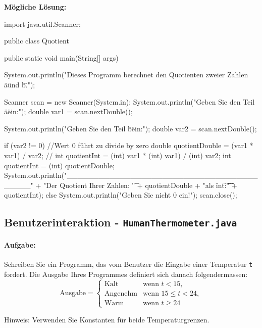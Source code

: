 \documentclass[a4paper,10pt, dvipsnames]{report}
\begin{document}
\textbf{Mögliche Lösung:}

\begin{javacodebox}
import java.util.Scanner;

public class Quotient {
    public static void main(String[] args) {

        System.out.println("Dieses Programm berechnet den Quotienten
                            zweier Zahlen \"a\" und \"b\".");
        
        Scanner scan = new Scanner(System.in);
        System.out.println("Geben Sie den Teil \"a\" ein:");
        double var1 = scan.nextDouble();
        
        System.out.println("Geben Sie den Teil \"b\" ein:");
        double var2 = scan.nextDouble();
        
        if (var2 != 0) { //Wert 0 führt zu divide by zero
            double quotientDouble = (var1 * var1) / var2;
            // int quotientInt = (int) var1 * (int) var1) / (int) var2;
            int quotientInt = (int) quotientDouble;
            System.out.println("_________________________________________\n" + 
                "Der Quotient Ihrer Zahlen: \t" + quotientDouble + 
                "\nUnd als \"int\":\t \t \t" + quotientInt);
        } else { 
            System.out.println("Geben Sie nicht 0 ein!");
        }
        scan.close();
    }
}
\end{javacodebox}

\subsection{Benutzerinteraktion - \texttt{HumanThermometer.java}}

\paragraph{Aufgabe:}
Schreiben Sie ein Programm, das vom Benutzer die Eingabe einer Temperatur \texttt{t} fordert. Die Ausgabe Ihres Programmes definiert sich danach folgendermassen:
\[
\text{Ausgabe} = 
\begin{cases} 
\text{Kalt} & \text{wenn } t < 15, \\
\text{Angenehm} & \text{wenn } 15 \leq t < 24, \\
\text{Warm} & \text{wenn } t \geq 24 
\end{cases}
\]

Hinweis: Verwenden Sie Konstanten für beide Temperaturgrenzen.
\end{document}
